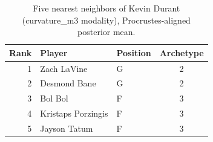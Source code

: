 \begin{table}[htbp]
  \centering\small
  \begin{tabular}{rllc}
    \toprule
    Rank & Player & Position & Archetype \\
    \midrule
    1 & Zach LaVine & G & 2 \\
    2 & Desmond Bane & G & 2 \\
    3 & Bol Bol & F & 3 \\
    4 & Kristaps Porzingis & F & 3 \\
    5 & Jayson Tatum & F & 3 \\
    \bottomrule
  \end{tabular}
  \caption{Five nearest neighbors of Kevin Durant (curvature_m3 modality), Procrustes-aligned posterior mean.}
  \label{tab:Kevin_Durant_neighbors_curvature_m3}
\end{table}

